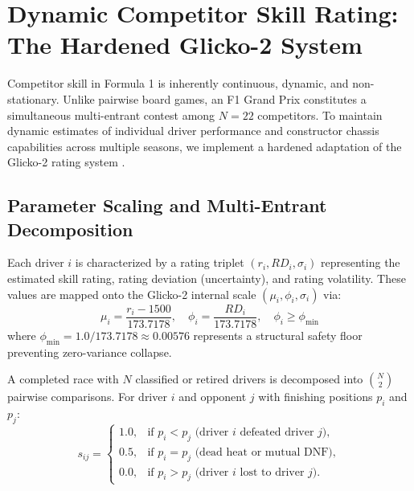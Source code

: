 \section{Dynamic Competitor Skill Rating: The Hardened Glicko-2 System}
\label{sec:glicko2_ratings}

Competitor skill in Formula 1 is inherently continuous, dynamic, and non-stationary. Unlike pairwise board games, an F1 Grand Prix constitutes a simultaneous multi-entrant contest among $N = 22$ competitors. To maintain dynamic estimates of individual driver performance and constructor chassis capabilities across multiple seasons, we implement a hardened adaptation of the Glicko-2 rating system \cite{glickman1999parameter, glickman2001glicko2}.

\subsection{Parameter Scaling and Multi-Entrant Decomposition}
Each driver $i$ is characterized by a rating triplet $(r_i, RD_i, \sigma_i)$ representing the estimated skill rating, rating deviation (uncertainty), and rating volatility. These values are mapped onto the Glicko-2 internal scale $(\mu_i, \phi_i, \sigma_i)$ via:
\begin{equation}
\mu_i = \frac{r_i - 1500}{173.7178}, \quad \phi_i = \frac{RD_i}{173.7178}, \quad \phi_i \ge \phi_{\min}
\label{eq:glicko_scaling}
\end{equation}
where $\phi_{\min} = 1.0 / 173.7178 \approx 0.00576$ represents a structural safety floor preventing zero-variance collapse.

A completed race with $N$ classified or retired drivers is decomposed into $\binom{N}{2}$ pairwise comparisons. For driver $i$ and opponent $j$ with finishing positions $p_i$ and $p_j$:
\begin{equation}
s_{ij} = \begin{cases}
1.0, & \text{if } p_i < p_j \text{ (driver $i$ defeated driver $j$)}, \\
0.5, & \text{if } p_i = p_j \text{ (dead heat or mutual DNF)}, \\
0.0, & \text{if } p_i > p_j \text{ (driver $i$ lost to driver $j$)}.
\end{cases}
\label{eq:pairwise_outcome}
\end{equation}

